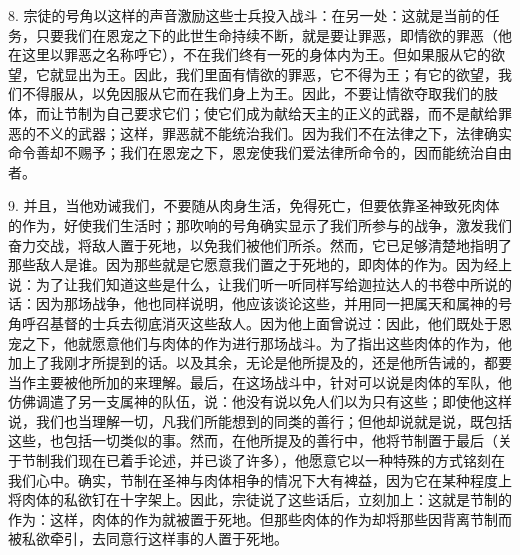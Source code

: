 8. 宗徒的号角以这样的声音激励这些士兵投入战斗：在另一处：这就是当前的任务，只要我们在恩宠之下的此世生命持续不断，就是要让罪恶，即情欲的罪恶（他在这里以罪恶之名称呼它），不在我们终有一死的身体内为王。但如果服从它的欲望，它就显出为王。因此，我们里面有情欲的罪恶，它不得为王；有它的欲望，我们不得服从，以免因服从它而在我们身上为王。因此，不要让情欲夺取我们的肢体，而让节制为自己要求它们；使它们成为献给天主的正义的武器，而不是献给罪恶的不义的武器；这样，罪恶就不能统治我们。因为我们不在法律之下，法律确实命令善却不赐予；我们在恩宠之下，恩宠使我们爱法律所命令的，因而能统治自由者。\par

9. 并且，当他劝诫我们，不要随从肉身生活，免得死亡，但要依靠圣神致死肉体的作为，好使我们生活时；那吹响的号角确实显示了我们所参与的战争，激发我们奋力交战，将敌人置于死地，以免我们被他们所杀。然而，它已足够清楚地指明了那些敌人是谁。因为那些就是它愿意我们置之于死地的，即肉体的作为。因为经上说：为了让我们知道这些是什么，让我们听一听同样写给迦拉达人的书卷中所说的话：因为那场战争，他也同样说明，他应该谈论这些，并用同一把属天和属神的号角呼召基督的士兵去彻底消灭这些敌人。因为他上面曾说过：因此，他们既处于恩宠之下，他就愿意他们与肉体的作为进行那场战斗。为了指出这些肉体的作为，他加上了我刚才所提到的话。以及其余，无论是他所提及的，还是他所告诫的，都要当作主要被他所加的来理解。最后，在这场战斗中，针对可以说是肉体的军队，他仿佛调遣了另一支属神的队伍，说：他没有说以免人们以为只有这些；即使他这样说，我们也当理解一切，凡我们所能想到的同类的善行；但他却说就是说，既包括这些，也包括一切类似的事。然而，在他所提及的善行中，他将节制置于最后（关于节制我们现在已着手论述，并已谈了许多），他愿意它以一种特殊的方式铭刻在我们心中。确实，节制在圣神与肉体相争的情况下大有裨益，因为它在某种程度上将肉体的私欲钉在十字架上。因此，宗徒说了这些话后，立刻加上：这就是节制的作为：这样，肉体的作为就被置于死地。但那些肉体的作为却将那些因背离节制而被私欲牵引，去同意行这样事的人置于死地。\par

